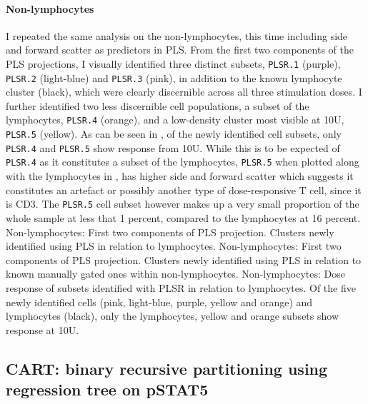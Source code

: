 \paragraph{Non-lymphocytes} 
I repeated the same analysis on the non-lymphocytes, this time including side and forward scatter as predictors in \gls{PLS}.
From the first two components of the \gls{PLS} projections, I visually identified three distinct subsets, \texttt{PLSR.1} (purple), \texttt{PLSR.2} (light-blue) and \texttt{PLSR.3} (pink),
in addition to the known lymphocyte cluster (black), which were clearly discernible across all three stimulation doses.
I further identified two less discernible cell populations, a subset of the lymphocytes, \texttt{PLSR.4} (orange), and a low-density cluster most visible at 10U, \texttt{PLSR.5} (yellow).
As can be seen in , of the newly identified cell subsets, only \texttt{PLSR.4} and \texttt{PLSR.5} show response from 10U.
While this is to be expected of \texttt{PLSR.4} as it constitutes a subset of the lymphocytes, \texttt{PLSR.5} when plotted along with the lymphocytes in , has higher side and forward scatter which suggests it constitutes an artefact or possibly another type of dose-responsive T cell, since it is CD3\positive.
The \texttt{PLSR.5} cell subset however makes up a very small proportion of the whole sample at less that 1 percent, compared to the lymphocytes at 16 percent.  
{ Non-lymphocytes: First two components of \gls{PLS} projection.  Clusters newly identified using \gls{PLS} in relation to lymphocytes. }
{ } 
{ Non-lymphocytes: First two components of \gls{PLS} projection.  Clusters newly identified using \gls{PLS} in relation to known manually gated ones within non-lymphocytes. }
{ } 
{ Non-lymphocytes: Dose response of subsets identified with PLSR in relation to lymphocytes. }
{
    Of the five newly identified cells (pink, light-blue, purple, yellow and orange) and lymphocytes (black), only
    the lymphocytes, yellow and orange subsets show response at 10U.
} 
\clearpage



\subsection{CART: binary recursive partitioning using regression tree on pSTAT5}

